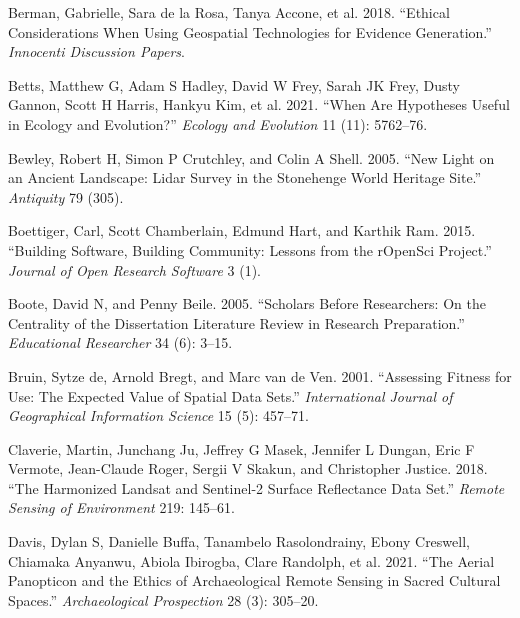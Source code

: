 \documentclass[
  12pt,
]{article}
\newlength{\cslhangindent}
\newlength{\cslentryspacingunit} %
\newenvironment{CSLReferences}[2] %
 {%
  \setlength{\parindent}{0pt}
  \ifodd #1
  \let\oldpar\par
  \def\par{\hangindent=\cslhangindent\oldpar}
  \fi
  \setlength{\parskip}{#2\cslentryspacingunit}
 }%
 {}
\begin{document}
\begin{CSLReferences}{1}{0}
\leavevmode{}%
Berman, Gabrielle, Sara de la Rosa, Tanya Accone, et al. 2018.
{``Ethical Considerations When Using Geospatial Technologies for
Evidence Generation.''} \emph{Innocenti Discussion Papers}.

\leavevmode{}%
Betts, Matthew G, Adam S Hadley, David W Frey, Sarah JK Frey, Dusty
Gannon, Scott H Harris, Hankyu Kim, et al. 2021. {``When Are Hypotheses
Useful in Ecology and Evolution?''} \emph{Ecology and Evolution} 11
(11): 5762--76.

\leavevmode{}%
Bewley, Robert H, Simon P Crutchley, and Colin A Shell. 2005. {``New
Light on an Ancient Landscape: Lidar Survey in the Stonehenge World
Heritage Site.''} \emph{Antiquity} 79 (305).

\leavevmode{}%
Boettiger, Carl, Scott Chamberlain, Edmund Hart, and Karthik Ram. 2015.
{``Building Software, Building Community: Lessons from the rOpenSci
Project.''} \emph{Journal of Open Research Software} 3 (1).

\leavevmode{}%
Boote, David N, and Penny Beile. 2005. {``Scholars Before Researchers:
On the Centrality of the Dissertation Literature Review in Research
Preparation.''} \emph{Educational Researcher} 34 (6): 3--15.

\leavevmode{}%
Bruin, Sytze de, Arnold Bregt, and Marc van de Ven. 2001. {``Assessing
Fitness for Use: The Expected Value of Spatial Data Sets.''}
\emph{International Journal of Geographical Information Science} 15 (5):
457--71.

\leavevmode{}%
Claverie, Martin, Junchang Ju, Jeffrey G Masek, Jennifer L Dungan, Eric
F Vermote, Jean-Claude Roger, Sergii V Skakun, and Christopher Justice.
2018. {``The Harmonized Landsat and Sentinel-2 Surface Reflectance Data
Set.''} \emph{Remote Sensing of Environment} 219: 145--61.

\leavevmode{}%
Davis, Dylan S, Danielle Buffa, Tanambelo Rasolondrainy, Ebony Creswell,
Chiamaka Anyanwu, Abiola Ibirogba, Clare Randolph, et al. 2021. {``The
Aerial Panopticon and the Ethics of Archaeological Remote Sensing in
Sacred Cultural Spaces.''} \emph{Archaeological Prospection} 28 (3):
305--20.


\end{CSLReferences}
\end{document}
